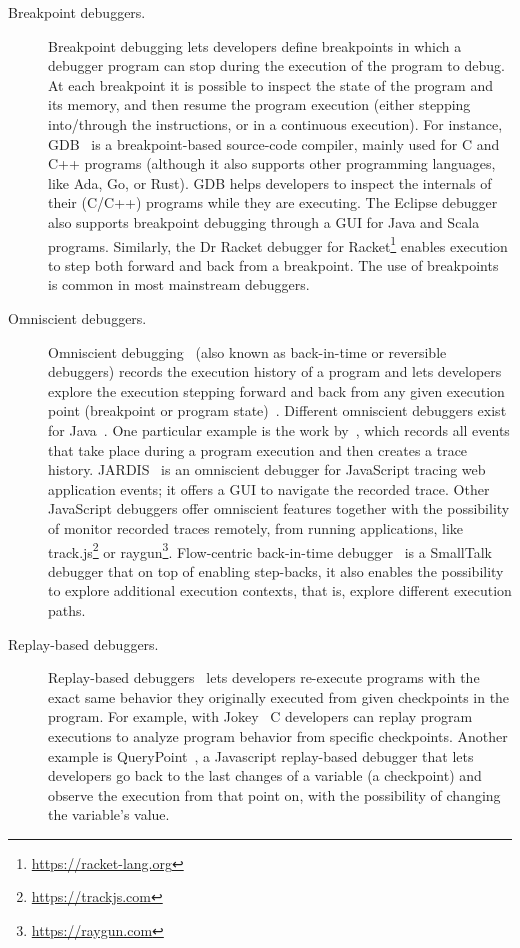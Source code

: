 \begin{description}
\item[Breakpoint debuggers.] Breakpoint debugging lets developers define breakpoints in which 
a debugger program can stop during the execution of the program to debug. At each breakpoint it is 
possible to inspect the state of the program and its memory, and then resume the program execution 
(either stepping into/through the instructions, or in a continuous execution). For instance, 
\ac{GDB}~\cite{stallman11} is a breakpoint-based source-code compiler, mainly used for C and C++ 
programs (although it also supports other programming languages, like Ada, Go, or Rust). GDB helps 
developers to inspect the internals of their (C/C++) programs while they are executing. The Eclipse
debugger~\cite{matloff08} also supports breakpoint debugging through a GUI for Java and Scala 
programs. Similarly, the Dr Racket debugger for Racket\footnote{\url{https://racket-lang.org}} enables 
execution to step both forward and back from a breakpoint. The use of breakpoints is common in most 
mainstream debuggers.

\item[Omniscient debuggers.] Omniscient debugging~\cite{lienhard08,pothier09} (also known as 
back-in-time or reversible debuggers) 
records the execution history of a program and lets developers explore the execution stepping 
forward and back from any given execution point (\ie breakpoint or program state)~\cite{hofer06}.  
Different omniscient debuggers exist for Java~\cite{lewis03}. One particular example is the work 
by~\citet{pothier07}, which records all events that take place during a program execution and then 
creates a trace history. JARDIS~\cite{barr16} is an omniscient debugger for JavaScript 
tracing web application events; it offers a GUI to navigate the recorded trace. Other JavaScript 
debuggers offer omniscient features together with the possibility of monitor recorded traces remotely, 
from running applications, like track.js\footnote{\url{https://trackjs.com}} or 
raygun\footnote{\url{https://raygun.com}}. Flow-centric back-in-time debugger~\cite{lienhard09} 
is a SmallTalk debugger that on top of enabling step-backs, it also enables the possibility to 
explore additional execution contexts, that is, explore different execution paths.

\item[Replay-based debuggers.] Replay-based debuggers~\cite{burg13,honarmand14} lets developers 
re-execute programs with the exact same behavior they originally executed from given checkpoints 
in the program. For example, with Jokey~\cite{saito05} C developers can replay program executions 
to analyze program behavior from specific checkpoints. Another example is
QueryPoint~\cite{mirghasemi11}, a Javascript replay-based debugger that lets developers go back to 
the last changes of a variable (\ie a checkpoint) and observe the execution from that point on, with 
the possibility of changing the variable's value.


\end{description}
